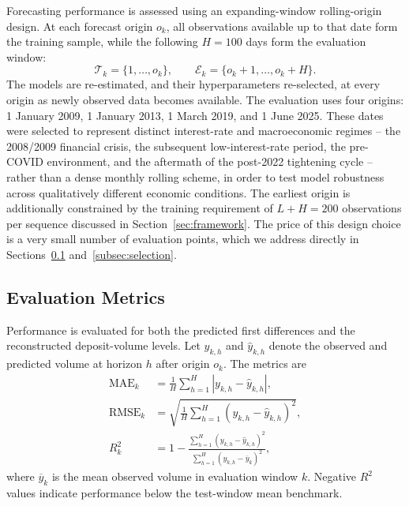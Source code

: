 \documentclass[11pt,a4paper]{article}
\begin{document}
Forecasting performance is assessed using an expanding-window rolling-origin
design. At each forecast origin \(o_k\), all observations available up to that
date form the training sample, while the following \(H=100\) days form the
evaluation window:
\begin{equation*}
    \mathcal{T}_k=\{1,\ldots,o_k\},
    \qquad
    \mathcal{E}_k=\{o_k+1,\ldots,o_k+H\}.
\end{equation*}
The models are re-estimated, and their hyperparameters re-selected, at every
origin as newly observed data becomes available. The evaluation uses four
origins: 1 January 2009, 1 January 2013, 1 March 2019, and 1 June 2025. These
dates were selected to represent distinct interest-rate and macroeconomic
regimes -- the 2008/2009 financial crisis, the subsequent low-interest-rate
period, the pre-COVID environment, and the aftermath of the post-2022
tightening cycle -- rather than a dense monthly rolling scheme, in order to
test model robustness across qualitatively different economic conditions. The
earliest origin is additionally constrained by the training requirement of
$L + H = 200$ observations per sequence discussed in
Section~\ref{sec:framework}. The price of this design choice is a very small
number of evaluation points, which we address directly in
Sections~\ref{subsec:evaluation_metrics} and~\ref{subsec:selection}.

\subsection{Evaluation Metrics}
\label{subsec:evaluation_metrics}

Performance is evaluated for both the predicted first differences and the
reconstructed deposit-volume levels. Let \(y_{k,h}\) and \(\widehat{y}_{k,h}\)
denote the observed and predicted volume at horizon \(h\) after origin
\(o_k\). The metrics are
\begin{align*}
    \operatorname{MAE}_k
    &=
    \frac{1}{H}
    \sum_{h=1}^{H}
    \left|y_{k,h}-\widehat{y}_{k,h}\right|, \\
    \operatorname{RMSE}_k
    &=
    \sqrt{
        \frac{1}{H}
        \sum_{h=1}^{H}
        \left(y_{k,h}-\widehat{y}_{k,h}\right)^2
    }, \\
    R_k^2
    &=
    1-
    \frac{
        \sum_{h=1}^{H}
        \left(y_{k,h}-\widehat{y}_{k,h}\right)^2
    }{
        \sum_{h=1}^{H}
        \left(y_{k,h}-\overline{y}_k\right)^2
    },
\end{align*}
where \(\overline{y}_k\) is the mean observed volume in evaluation window
\(k\). Negative \(R^2\) values indicate performance below the test-window mean
benchmark.
\end{document}

